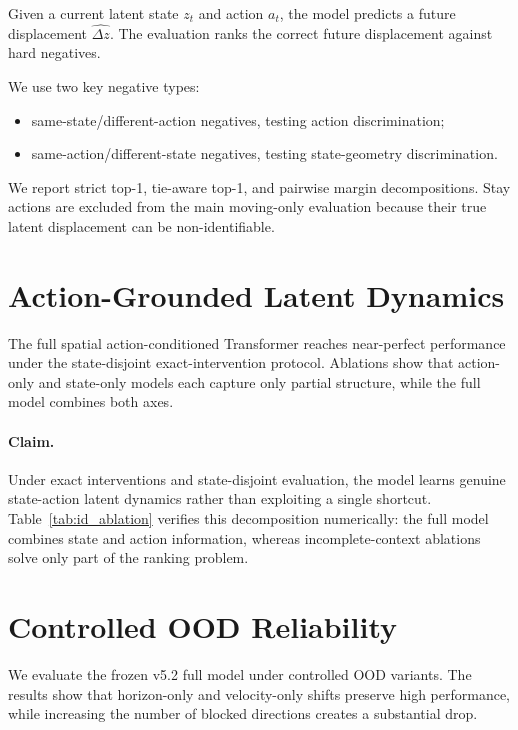 \documentclass[10pt]{article}
\begin{document}
Given a current latent state $z_t$ and action $a_t$, the model predicts a future displacement $\hat{\Delta z}$.
The evaluation ranks the correct future displacement against hard negatives.

We use two key negative types:
\begin{itemize}
    \item same-state/different-action negatives, testing action discrimination;
    \item same-action/different-state negatives, testing state-geometry discrimination.
\end{itemize}

We report strict top-1, tie-aware top-1, and pairwise margin decompositions.
Stay actions are excluded from the main moving-only evaluation because their true latent displacement can be non-identifiable.

\section{Action-Grounded Latent Dynamics}

The full spatial action-conditioned Transformer reaches near-perfect performance under the state-disjoint exact-intervention protocol.
Ablations show that action-only and state-only models each capture only partial structure, while the full model combines both axes.

\paragraph{Claim.}
Under exact interventions and state-disjoint evaluation, the model learns genuine state-action latent dynamics rather than exploiting a single shortcut.
Table~\ref{tab:id_ablation} verifies this decomposition numerically: the full model combines state and action information, whereas incomplete-context ablations solve only part of the ranking problem.



\section{Controlled OOD Reliability}

We evaluate the frozen v5.2 full model under controlled OOD variants.
The results show that horizon-only and velocity-only shifts preserve high performance, while increasing the number of blocked directions creates a substantial drop.
\end{document}
